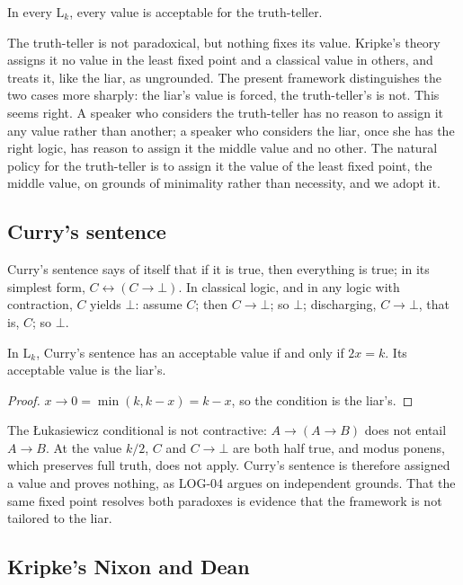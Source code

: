 \documentclass{situationist-preprint}
\begin{document}
\begin{proposition}\label{p:teller}
In every $\mathrm{L}_k$, every value is acceptable for the truth-teller.
\end{proposition}

The truth-teller is not paradoxical, but nothing fixes its value. Kripke's theory assigns it no value in the least fixed point and a classical value in others, and treats it, like the liar, as ungrounded. The present framework distinguishes the two cases more sharply: the liar's value is forced, the truth-teller's is not. This seems right. A speaker who considers the truth-teller has no reason to assign it any value rather than another; a speaker who considers the liar, once she has the right logic, has reason to assign it the middle value and no other. The natural policy for the truth-teller is to assign it the value of the least fixed point, the middle value, on grounds of minimality rather than necessity, and we adopt it.

\subsection{Curry's sentence}

Curry's sentence says of itself that if it is true, then everything is true; in its simplest form, $C \leftrightarrow (C \to \bot)$. In classical logic, and in any logic with contraction, $C$ yields $\bot$: assume $C$; then $C \to \bot$; so $\bot$; discharging, $C \to \bot$, that is, $C$; so $\bot$.

\begin{proposition}\label{p:curry}
In $\mathrm{L}_k$, Curry's sentence has an acceptable value if and only if $2x = k$. Its acceptable value is the liar's.
\end{proposition}

\begin{proof}
$x \to 0 = \min(k, k - x) = k - x$, so the condition is the liar's.
\end{proof}

The Łukasiewicz conditional is not contractive: $A \to (A \to B)$ does not entail $A \to B$. At the value $k/2$, $C$ and $C \to \bot$ are both half true, and modus ponens, which preserves full truth, does not apply. Curry's sentence is therefore assigned a value and proves nothing, as LOG-04 argues on independent grounds. That the same fixed point resolves both paradoxes is evidence that the framework is not tailored to the liar.

\subsection{Kripke's Nixon and Dean}
\end{document}
